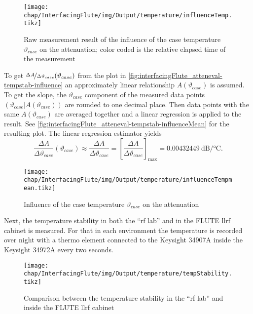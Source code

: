 \begin{figure}[tb]
	\centering
	\texttt{[image: chap/InterfacingFlute/img/Output/temperature/influenceTemp.tikz]}
	\caption{Raw measurement result of the influence of the case temperature $\vartheta_{case}$ on the attenuation; color coded is the relative elapsed time of the measurement}
	\label{fig:interfacingFlute_atteneval-tempstab-influence}
\end{figure}

To get $\nicefrac{\Delta A}{\Delta \vartheta_{case}} (\vartheta_{case})$ from the plot in \autoref{fig:interfacingFlute_atteneval-tempstab-influence} an approximately linear relationship $A(\vartheta_{case})$ is assumed. To get the slope, the $\vartheta_{case}$ component of the measured data points $(\vartheta_{case}|A(\vartheta_{case}))$ are rounded to one decimal place. Then data points with the same $A(\vartheta_{case})$ are averaged together and a linear regression is applied to the result. See \autoref{fig:interfacingFlute_atteneval-tempstab-influenceMean} for the resulting plot. The linear regression estimator yields
\begin{equation}
\frac{\Delta A}{\Delta \vartheta_{case}} (\vartheta_{case})
\approx \frac{\Delta A}{\Delta \vartheta_{case}}
= \left[\frac{\Delta A}{\Delta \vartheta_{case}}\right]_\text{max}
= \SI{0.00432449}{\dB\per\celsius}.
\end{equation}

\begin{figure}[tb]
	\centering
	\texttt{[image: chap/InterfacingFlute/img/Output/temperature/influenceTempmean.tikz]}
	\caption{Influence of the case temperature $\vartheta_{case}$ on the attenuation}
	\label{fig:interfacingFlute_atteneval-tempstab-influenceMean}
\end{figure}

Next, the temperature stability in both the ``\gls{rf} lab'' and in the FLUTE \gls{llrf} cabinet is measured. For that in each environment the temperature is recorded over night with a thermo element connected to the Keysight 34907A inside the Keysight 34972A every two seconds.

\begin{figure}[tb]
	\centering
	\texttt{[image: chap/InterfacingFlute/img/Output/temperature/tempStability.tikz]}
	\caption{Comparison between the temperature stability in the ``\gls{rf} lab'' and inside the FLUTE \gls{llrf} cabinet}
	\label{fig:interfacingFlute_atteneval-tempstab-time}
\end{figure}


